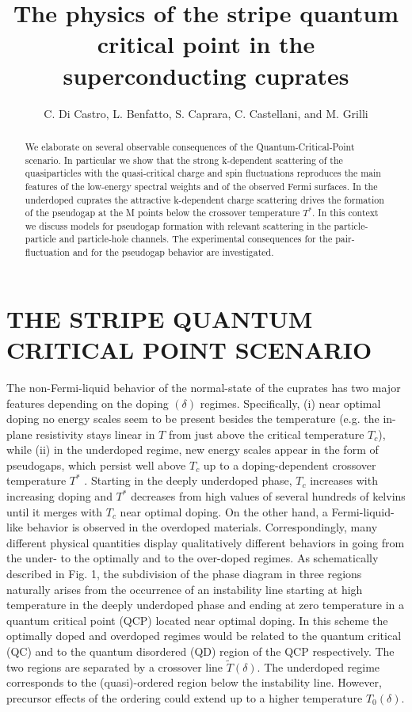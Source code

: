 \documentclass[twoside]{article}
\title{The physics of the stripe quantum critical point in  the superconducting cuprates}
\author{C. Di Castro, L. Benfatto, S. Caprara,  C. Castellani, and M. Grilli\address{INFM and Dipartimento di Fisica Universit\`{a} di Roma ``La Sapienza'' \\   00185 Rome, Italy}}
\begin{document}
\begin{abstract}

We elaborate on several observable consequences of the Quantum-Critical-Point
scenario. In particular we show that
the strong k-dependent scattering of the quasiparticles with the
quasi-critical charge and spin fluctuations reproduces the main features of
the low-energy spectral weights and of the observed Fermi surfaces. In the
underdoped cuprates the attractive k-dependent charge scattering drives the
formation of the pseudogap at the M points below the crossover temperature
$T^*$. In this context we discuss models for pseudogap formation with
relevant scattering in the particle-particle and particle-hole channels. The
experimental consequences for the pair-fluctuation and for the
pseudogap behavior are investigated.
\vspace{1pc}
\end{abstract}

\maketitle

\section{THE STRIPE QUANTUM CRITICAL POINT SCENARIO}

The non-Fermi-liquid behavior of the normal-state of the cuprates has two
major features depending on the doping $(\delta)$ regimes. Specifically,
(i) near optimal doping no energy scales seem to be present besides the
temperature (e.g. the in-plane resistivity stays linear in $T$ from just
above the critical temperature $T_c$), while (ii) in the underdoped regime,
new energy
scales appear in the form of pseudogaps, which persist well above $T_c$ up to
a doping-dependent crossover temperature $T^*$ \cite{timusk}. Starting in the
deeply underdoped phase, $T_c$ increases with increasing doping and $T^*$
decreases from high values of several hundreds of kelvins until it merges
with $T_c$ near optimal doping. On the other hand, a Fermi-liquid-like
behavior is observed in the overdoped materials. Correspondingly,
many different physical quantities display qualitatively different
behaviors in going from the under- to the optimally and to the over-doped
regimes. As schematically described in Fig. 1, the subdivision of the phase
diagram in three regions naturally arises from the occurrence of an
instability line starting at high temperature in the deeply underdoped phase
and ending at zero temperature in a quantum critical point (QCP) located near
optimal doping.
In this scheme the optimally doped and overdoped regimes would be related to
the quantum critical (QC) and to the quantum disordered (QD) region of the
QCP respectively. The two regions are separated by a crossover line
$\tilde{T}(\delta)$. The underdoped regime corresponds to the (quasi)-ordered
region below the instability line. However, precursor effects of the ordering
could extend up to a higher temperature $T_0(\delta)$.
\end{document}
